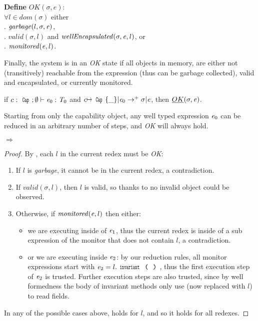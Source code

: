 \noindent\textbf{Define} $\mathit{OK}(\sigma,e)$:\\
\indent $\forall l\in\textit{dom}(\sigma)$
  either\\
\indent{}. $\mathit{garbage}(l,\sigma,{\mathit{e}})$,\\
\indent{}. $\mathit{valid}(\sigma,l)$ and $\mathit{wellEncapsulated}(\sigma,{\mathit{e}},l)$, or\\
\indent{}. $\mathit{monitored}({\mathit{e}},l)$.

\noindent Finally, the system is in an \emph{OK} state
if all objects in memory, are either
not (transitively) reachable from the expression (thus can be garbage collected),
valid and encapsulated,
or currently monitored.

\begin{theorem}\rm
if $c:\Kw{Cap};\emptyset\vdash \e_0: \T_0$ and
$c\mapsto\Kw{Cap}\{\_\}|\e_0\rightarrow^+ \sigma|\e$, then
$\emph{OK}(\sigma,{\mathit{e}})$.
\end{theorem}
\noindent Starting from only the capability object,
any well typed expression ${\mathit{e}}_0$ can be reduced in an arbitrary number of steps,
and \emph{OK} will always hold.

\begin{theorem}\rm {} $\Rightarrow$ 
\end{theorem}
\begin{proof}
\noindent By , each $l$ in the current redex must be \emph{OK}:
\begin{enumerate}
	\item If $l$ is \emph{garbage}, it cannot be in the current redex, a contradiction.
	\item If $\mathit{valid}(\sigma,l)$, then $l$ is valid, so thanks to 
	no invalid object could be observed.
	\item Otherwise, if $\mathit{monitored}({\mathit{e}},l)$ then either:
	\begin{itemize}
	 \item we are executing inside of ${\mathit{e}}_1$, thus the current redex is inside of a sub expression of the monitor that does not contain $l$, a contradiction.
	 \item or we are executing inside ${\mathit{e}}_2$:
	 by our reduction rules, all monitor expressions start with
	 $\e_2=l.\invariant$, thus the first execution step
	 of ${\mathit{e}}_2$ is trusted. Further execution steps are also trusted, since by well formedness the body of invariant methods only use \Q@this@ (now replaced with $l$) to read fields.
	\end{itemize}
\end{enumerate}
In any of the possible cases above,  holds for $l$, and so it holds for all redexes.
\end{proof}

